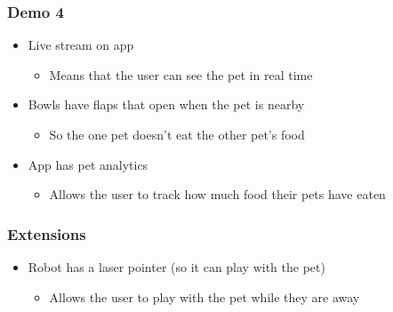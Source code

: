         \subsubsection{Demo 4}
        \begin{itemize}
            \setlength{\itemindent}{.2in}
            \item Live stream on app
                \begin{itemize}
                    \setlength{\itemindent}{.3in}
                    \item Means that the user can see the pet in real time 
                \end{itemize}
            \item Bowls have flaps that open when the pet is nearby
                \begin{itemize}
                    \setlength{\itemindent}{.3in}
                    \item So the one pet doesn’t eat the other pet’s food
                \end{itemize}
            \item App has pet analytics
                \begin{itemize}
                    \setlength{\itemindent}{.3in}
                    \item Allows the user to track how much food their pets have eaten
                \end{itemize}
        \end{itemize}
        \subsubsection{Extensions}
        \begin{itemize}
        \setlength{\itemindent}{.2in}
            \item Robot has a laser pointer (so it can play with the pet)
                \begin{itemize}
                    \setlength{\itemindent}{.3in}
                    \item Allows the user to play with the pet while they are away
                \end{itemize}
        \end{itemize}